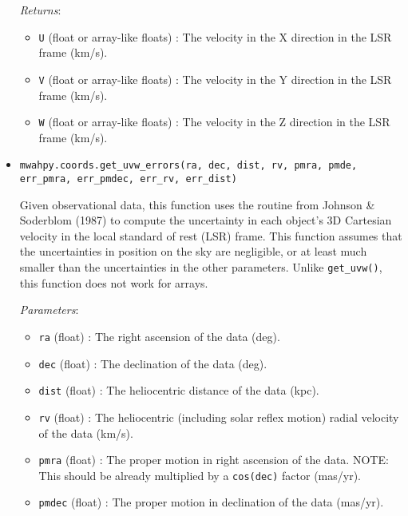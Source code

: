 \documentclass{article}
\begin{document}
\begin{itemize}
\begin{itemize}
\end{itemize}

\textit{Returns}: \begin{itemize}

\item \verb!U! (float or array-like floats) : The velocity in the X direction in the LSR frame (km/s).

\item \verb!V! (float or array-like floats) : The velocity in the Y direction in the LSR frame (km/s).

\item \verb!W! (float or array-like floats) : The velocity in the Z direction in the LSR frame (km/s).

\end{itemize}



\item \verb!mwahpy.coords.get_uvw_errors(ra, dec, dist, rv, pmra, pmde, err_pmra, err_pmdec, err_rv, err_dist)!

Given observational data, this function uses the routine from Johnson \& Soderblom (1987) to compute the uncertainty in each object's 3D Cartesian velocity in the local standard of rest (LSR) frame. This function assumes that the uncertainties in position on the sky are negligible, or at least much smaller than the uncertainties in the other parameters. Unlike \verb!get_uvw()!, this function does not work for arrays.

\textit{Parameters}: \begin{itemize}

\item \verb!ra! (float) : The right ascension of the data (deg).

\item \verb!dec! (float) : The declination of the data (deg).

\item \verb!dist! (float) : The heliocentric distance of the data (kpc).

\item \verb!rv! (float) : The heliocentric (including solar reflex motion) radial velocity of the data (km/s).

\item \verb!pmra! (float) : The proper motion in right ascension of the data. NOTE: This should be already multiplied by a \verb!cos(dec)! factor (mas/yr). 

\item \verb!pmdec! (float) : The proper motion in declination of the data (mas/yr).


\end{itemize}
\end{itemize}
\end{document}
